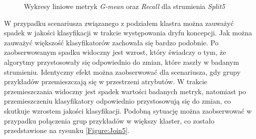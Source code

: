 \begin{figure}[h]
    \centering
    \qquad
    \caption{Wykresy liniowe metryk \textit{G-mean} oraz \textit{Recall} dla strumienia \textit{Split5}}\label{Figure:Split5}
\end{figure}

\noindent W przypadku scenariusza związanego z podziałem klastra można zauważyć spadek w jakości klasyfikacji w trakcie występowania dryfu koncepcji. Jak można zauważyć większość klasyfikatorów zachowała się bardzo podobnie. Po zaobserwowanym spadku widoczny jest wzrost, który świadczy o tym, że algorytmy przystosowały się odpowiednio do zmian, które zaszły w badanym strumieniu. Identyczny efekt można zaobserwować dla scenariusza, gdy grupy przykładów przemieszczają się w przestrzeni atrybutów. W trakcie przemieszczania widoczny jest spadek wartości badanych metryk, natomiast po przemieszczeniu klasyfikatory odpowiednio przystosowują się do zmian, co skutkuje wzrostem jakości klasyfikacji. Podobną sytuację można zaobserwować w przypadku połączenia grup przykładów w większy klaster, co zostało przedstawione na rysunku \ref{Figure:Join5}.

